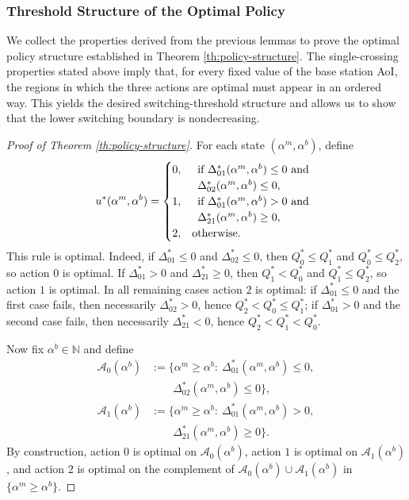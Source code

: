 \documentclass[letterpaper,journal]{IEEEtran}
\begin{document}
\subsubsection{Threshold Structure of the Optimal Policy}
We collect the properties derived from the previous lemmas to prove the optimal policy structure established in Theorem \ref{th:policy-structure}. The single-crossing properties stated above imply that, for every fixed value of the base station AoI, the regions in which the three actions are optimal must appear in an ordered way. This yields the desired switching-threshold structure and allows us to show that the lower switching boundary is nondecreasing.

\begin{proof}[Proof of Theorem \ref{th:policy-structure}]
For each state $(\alpha^m,\alpha^b)$, define
\[
u^*(\alpha^m,\alpha^b)=
\begin{cases}
0, & \begin{array}[t]{l}
\text{if } \Delta^*_{01}(\alpha^m,\alpha^b)\le 0\text{ and}\\
\Delta^*_{02}(\alpha^m,\alpha^b)\le 0,
\end{array}\\[0.4em]
1, & \begin{array}[t]{l}
\text{if } \Delta^*_{01}(\alpha^m,\alpha^b)>0\text{ and}\\
\Delta^*_{21}(\alpha^m,\alpha^b)\ge 0,
\end{array}\\[0.4em]
2, & \text{otherwise.}
\end{cases}
\]
This rule is optimal. Indeed, if $\Delta^*_{01}\le 0$ and $\Delta^*_{02}\le 0$, then $Q_0^*\le Q_1^*$ and $Q_0^*\le Q_2^*$, so action $0$ is optimal. If $\Delta^*_{01}>0$ and $\Delta^*_{21}\ge 0$, then $Q_1^*<Q_0^*$ and $Q_1^*\le Q_2^*$, so action $1$ is optimal. In all remaining cases action $2$ is optimal: if $\Delta^*_{01}\le 0$ and the first case fails, then necessarily $\Delta^*_{02}>0$, hence $Q_2^*<Q_0^*\le Q_1^*$; if $\Delta^*_{01}>0$ and the second case fails, then necessarily $\Delta^*_{21}<0$, hence $Q_2^*<Q_1^*<Q_0^*$.

Now fix $\alpha^b\in\mathbb N$ and define
\begin{align*}
\mathcal A_0(\alpha^b)
&:=\{\alpha^m\ge \alpha^b:\ \Delta^*_{01}(\alpha^m,\alpha^b)\le 0,\\
&\qquad \Delta^*_{02}(\alpha^m,\alpha^b)\le 0\},\\
\mathcal A_1(\alpha^b)
&:=\{\alpha^m\ge \alpha^b:\ \Delta^*_{01}(\alpha^m,\alpha^b)>0,\\
&\qquad \Delta^*_{21}(\alpha^m,\alpha^b)\ge 0\}.
\end{align*}
By construction, action $0$ is optimal on $\mathcal A_0(\alpha^b)$, action $1$ is optimal on
$\mathcal A_1(\alpha^b)$, and action $2$ is optimal on the complement of
$\mathcal A_0(\alpha^b)\cup \mathcal A_1(\alpha^b)$ in $\{\alpha^m\ge \alpha^b\}$.


\end{proof}
\end{document}
